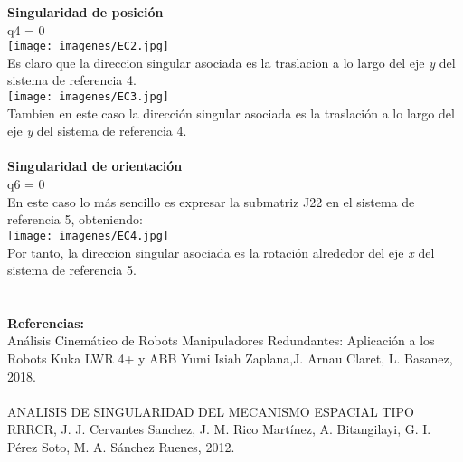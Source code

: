 \documentclass[12pt,a4paper]{report}
\begin{document}
\textbf{Singularidad de posición}\\
q4 = 0\\
\texttt{[image: imagenes/EC2.jpg]} \\
Es claro que la direccion singular asociada es la traslacion a lo largo del eje \textit{y} del sistema de referencia 4.\\
\texttt{[image: imagenes/EC3.jpg]}\\
Tambien en este caso la dirección singular asociada es la traslación a lo largo del eje \textit{y} del sistema de
referencia 4.\\\\
\textbf{Singularidad de orientación}\\
q6 = 0\\
En este caso lo más sencillo es expresar la submatriz J22 en el sistema de referencia {5}, obteniendo:\\
\texttt{[image: imagenes/EC4.jpg]} \\
Por tanto, la direccion singular asociada es la rotación alrededor del eje \textit{x} del sistema de referencia
{5}.\\\\\\
\textbf{Referencias:}\\
Análisis Cinemático de Robots Manipuladores Redundantes:
Aplicación a los Robots Kuka LWR 4+ y ABB Yumi
Isiah Zaplana,J. Arnau Claret, L. Basanez, 2018.\\\\
ANALISIS DE SINGULARIDAD DEL MECANISMO ESPACIAL TIPO RRRCR, J. J. Cervantes Sanchez, J. M. Rico Martínez, A. Bitangilayi, G. I. Pérez Soto, M. A. Sánchez Ruenes, 2012.
\end{document}
